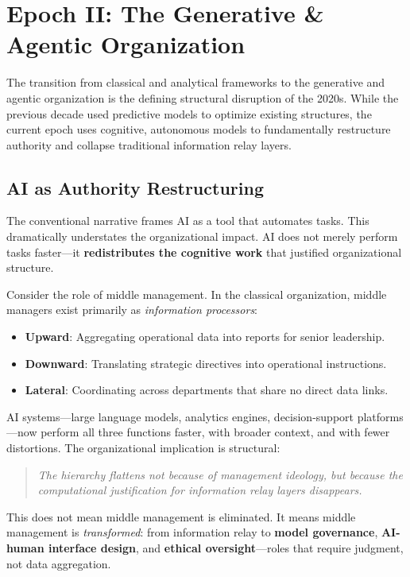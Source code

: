 \documentclass[11pt,a4paper,twocolumn]{article}
\begin{document}
\section{Epoch II: The Generative \& Agentic Organization}
\label{sec:epoch-ai}

The transition from classical and analytical frameworks to the generative and agentic organization is the defining structural disruption of the 2020s. While the previous decade used predictive models to optimize existing structures, the current epoch uses cognitive, autonomous models to fundamentally restructure authority and collapse traditional information relay layers.

\subsection{AI as Authority Restructuring}

The conventional narrative frames AI as a tool that automates tasks. This dramatically understates the organizational impact. AI does not merely perform tasks faster---it \textbf{redistributes the cognitive work} that justified organizational structure.

Consider the role of middle management. In the classical organization, middle managers exist primarily as \textit{information processors}:
\begin{itemize}[leftmargin=1.5em]
  \item \textbf{Upward}: Aggregating operational data into reports for senior leadership.
  \item \textbf{Downward}: Translating strategic directives into operational instructions.
  \item \textbf{Lateral}: Coordinating across departments that share no direct data links.
\end{itemize}

AI systems---large language models, analytics engines, decision-support platforms---now perform all three functions faster, with broader context, and with fewer distortions. The organizational implication is structural:

\begin{quote}
\textit{The hierarchy flattens not because of management ideology, but because the computational justification for information relay layers disappears.}
\end{quote}

This does not mean middle management is eliminated. It means middle management is \textit{transformed}: from information relay to \textbf{model governance}, \textbf{AI-human interface design}, and \textbf{ethical oversight}---roles that require judgment, not data aggregation.
\end{document}

